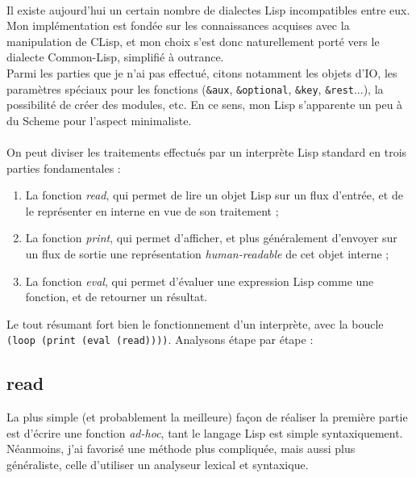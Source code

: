 \documentclass{article}
\begin{document}
\paragraph{}
Il existe aujourd'hui un certain nombre de dialectes Lisp incompatibles entre eux.
Mon implémentation est fondée sur les connaissances acquises avec la manipulation de CLisp,
et mon choix s'est donc naturellement porté vers le dialecte Common-Lisp, simplifié à outrance.
\\
Parmi les parties que je n'ai pas effectué, citons notamment les objets d'IO, les paramètres
spéciaux pour les fonctions (\texttt{\&aux}, \texttt{\&optional}, \texttt{\&key}, \texttt{\&rest}...), 
la possibilité de créer des modules, etc.
En ce sens, mon Lisp s'apparente un peu à du Scheme pour l'aspect minimaliste.
\paragraph{}
On peut diviser les traitements effectués par un interprète Lisp standard en trois parties fondamentales :
\begin{enumerate}
  \item La fonction \emph{read}, qui permet de lire un objet Lisp sur un flux d'entrée, et de le représenter 
  en interne en vue de son traitement ;
  \item La fonction \emph{print}, qui permet d'afficher, et plus généralement d'envoyer sur un flux de sortie
  une représentation \emph{human-readable} de cet objet interne ;
  \item La fonction \emph{eval}, qui permet d'évaluer une expression Lisp comme une fonction, et de retourner
  un résultat.
\end{enumerate}
Le tout résumant fort bien le fonctionnement d'un interprète, avec la boucle
\texttt{(loop (print (eval (read))))}. Analysons étape par étape :

\subsection{read}
La plus simple (et probablement la meilleure) façon de réaliser la première partie est d'écrire une fonction
\emph{ad-hoc}, tant le langage Lisp est simple syntaxiquement. Néanmoins, j'ai favorisé une méthode plus compliquée,
mais aussi plus généraliste, celle d'utiliser un analyseur lexical et syntaxique.
\end{document}
